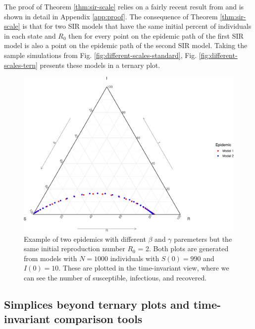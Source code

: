 \documentclass[
  shortnames]{jss}
\begin{document}
The proof of Theorem \ref{thm:sir-scale} relies on a fairly recent
result from \cite{Harko2014} and is shown in detail in Appendix
\ref{app:proof}. The consequence of Theorem \ref{thm:sir-scale} is that
for two SIR models that have the same initial percent of individuals in
each state and \(R_0\) then for every point on the epidemic path of the
first SIR model is also a point on the epidemic path of the second SIR
model. Taking the sample simulations from Fig.
\ref{fig:different-scales-standard}, Fig.
\ref{fig:different-scales-tern} presents these models in a ternary plot.

\begin{CodeChunk}
\begin{figure}[H]

{\centering \includegraphics{Figs/unnamed-chunk-3-1} 

}

\caption{\label{fig:ternary-ex}Example of two epidemics with different $\beta$ and $\gamma$ paremeters but the same initial reproduction number $R_0$ = 2.  Both plots are generated from models with $N= 1000$ individuals with $S(0) = 990$ and $I(0) = 10$.  These are plotted in the time-invariant view, where we can see the number of susceptible, infectious, and recovered.}\label{fig:unnamed-chunk-3}
\end{figure}
\end{CodeChunk}

\subsection[Simplexes beyond ternary plots]{Simplices beyond ternary
plots and time-invariant comparison
tools}\label{sec:time-invariant-in-simplex}
\end{document}
